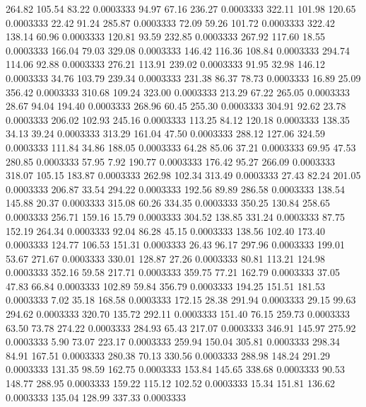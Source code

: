  264.82  105.54   83.22   0.0003333
  94.97   67.16  236.27   0.0003333
 322.11  101.98  120.65   0.0003333
  22.42   91.24  285.87   0.0003333
  72.09   59.26  101.72   0.0003333
 322.42  138.14   60.96   0.0003333
 120.81   93.59  232.85   0.0003333
 267.92  117.60   18.55   0.0003333
 166.04   79.03  329.08   0.0003333
 146.42  116.36  108.84   0.0003333
 294.74  114.06   92.88   0.0003333
 276.21  113.91  239.02   0.0003333
  91.95   32.98  146.12   0.0003333
  34.76  103.79  239.34   0.0003333
 231.38   86.37   78.73   0.0003333
  16.89   25.09  356.42   0.0003333
 310.68  109.24  323.00   0.0003333
 213.29   67.22  265.05   0.0003333
  28.67   94.04  194.40   0.0003333
 268.96   60.45  255.30   0.0003333
 304.91   92.62   23.78   0.0003333
 206.02  102.93  245.16   0.0003333
 113.25   84.12  120.18   0.0003333
 138.35   34.13   39.24   0.0003333
 313.29  161.04   47.50   0.0003333
 288.12  127.06  324.59   0.0003333
 111.84   34.86  188.05   0.0003333
  64.28   85.06   37.21   0.0003333
  69.95   47.53  280.85   0.0003333
  57.95    7.92  190.77   0.0003333
 176.42   95.27  266.09   0.0003333
 318.07  105.15  183.87   0.0003333
 262.98  102.34  313.49   0.0003333
  27.43   82.24  201.05   0.0003333
 206.87   33.54  294.22   0.0003333
 192.56   89.89  286.58   0.0003333
 138.54  145.88   20.37   0.0003333
 315.08   60.26  334.35   0.0003333
 350.25  130.84  258.65   0.0003333
 256.71  159.16   15.79   0.0003333
 304.52  138.85  331.24   0.0003333
  87.75  152.19  264.34   0.0003333
  92.04   86.28   45.15   0.0003333
 138.56  102.40  173.40   0.0003333
 124.77  106.53  151.31   0.0003333
  26.43   96.17  297.96   0.0003333
 199.01   53.67  271.67   0.0003333
 330.01  128.87   27.26   0.0003333
  80.81  113.21  124.98   0.0003333
 352.16   59.58  217.71   0.0003333
 359.75   77.21  162.79   0.0003333
  37.05   47.83   66.84   0.0003333
 102.89   59.84  356.79   0.0003333
 194.25  151.51  181.53   0.0003333
   7.02   35.18  168.58   0.0003333
 172.15   28.38  291.94   0.0003333
  29.15   99.63  294.62   0.0003333
 320.70  135.72  292.11   0.0003333
 151.40   76.15  259.73   0.0003333
  63.50   73.78  274.22   0.0003333
 284.93   65.43  217.07   0.0003333
 346.91  145.97  275.92   0.0003333
   5.90   73.07  223.17   0.0003333
 259.94  150.04  305.81   0.0003333
 298.34   84.91  167.51   0.0003333
 280.38   70.13  330.56   0.0003333
 288.98  148.24  291.29   0.0003333
 131.35   98.59  162.75   0.0003333
 153.84  145.65  338.68   0.0003333
  90.53  148.77  288.95   0.0003333
 159.22  115.12  102.52   0.0003333
  15.34  151.81  136.62   0.0003333
 135.04  128.99  337.33   0.0003333
